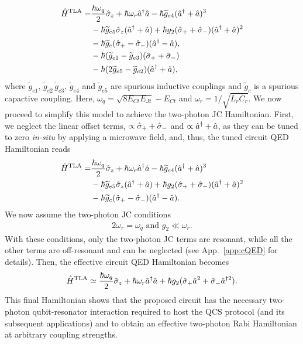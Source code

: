 \begin{align*}
    \hat{H}^{\text{TLA}}=&\frac{\hbar \omega_{q}}{2}\hat{\sigma}_z + \hbar \omega_r \hat{a}^\dagger \hat{a}  - \hbar \widetilde{g}_{e4}(\hat{a}^\dagger + \hat{a})^3 \nonumber\\&- \hbar \widetilde{g}_{e5}\hat{\sigma}_z(\hat{a}^\dagger + \hat{a})+ \hbar g_{2} (\hat{\sigma}_+ + \hat{\sigma}_-)(\hat{a}^\dagger+ \hat{a})^2 \nonumber\\ &- \hbar \widetilde{g}_c(\hat{\sigma}_+ -\hat{\sigma}_-)(\hat{a}^\dagger - \hat{a}),
    \nonumber\\ &- \hbar (\widetilde{g}_{e1}-\widetilde{g}_{e3})(\hat{\sigma}_+ + \hat{\sigma}_-) \nonumber\\ &- \hbar (2\widetilde{g}_{e5}-\widetilde{g}_{e2})(\hat{a}^\dagger +\hat{a}),
\end{align*}
where $\widetilde{g}_{e1},\,\widetilde{g}_{e2}\,\widetilde{g}_{e3},\,\widetilde{g}_{e4}$ and $\widetilde{g}_{e5}$ are spurious inductive couplings and $\widetilde{g}_{c}$ is a spurious capactive coupling. Here, $\omega_q=\sqrt{8E_{Ct} E_{Jt}}-E_{Ct}$ and $\omega_r=1/\sqrt{L_r\overline{C}_r}$. We now proceed to simplify this model to achieve the two-photon JC Hamiltonian. First, we neglect the linear offset terms, $\propto \hat{\sigma}_+ +\hat{\sigma}_-$ and $\propto \hat{a}^\dagger+\hat{a}$, as they can be tuned to zero \textit{in-situ} by applying a microwave field, and, thus, the tuned circuit QED Hamiltonian reads
\begin{align}\label{eq:TLAHamMain}
    \hat{H}^{\text{TLA}}=&\frac{\hbar \omega_{q}}{2}\hat{\sigma}_z + \hbar \omega_r \hat{a}^\dagger \hat{a}  - \hbar \widetilde{g}_{e4}(\hat{a}^\dagger + \hat{a})^3 \nonumber\\&- \hbar \widetilde{g}_{e5}\hat{\sigma}_z(\hat{a}^\dagger + \hat{a})+ \hbar g_{2} (\hat{\sigma}_+ + \hat{\sigma}_-)(\hat{a}^\dagger+ \hat{a})^2 \nonumber\\ &- \hbar \widetilde{g}_c(\hat{\sigma}_+ -\hat{\sigma}_-)(\hat{a}^\dagger - \hat{a}).
\end{align}
We now assume the two-photon JC conditions
\begin{align}
    2\omega_r=\omega_q \text{ and } g_2 \ll \omega_r.
\end{align}
With these conditions, only the two-photon JC terms are resonant, while all the other terms are off-resonant and can be neglected (see App.~\ref{app:cQED} for details). Then, the effective circuit QED Hamiltonian becomes
\begin{align}\label{eq:TwoPhJCMain}
    \hat{H}^{\text{TLA}}\simeq \frac{\hbar \omega_q}{2}\hat{\sigma}_z +\hbar\omega_r\hat{a}^\dagger \hat{a} + \hbar g_{2}( \hat{\sigma}_+ \hat{a}^2 + \hat{\sigma}_- \hat{a}^{\dagger 2}).
\end{align}
This final Hamiltonian shows that the proposed circuit has the necessary two-photon qubit-resonator interaction required to host the QCS protocol (and its subsequent applications) and to obtain an effective two-photon Rabi Hamiltonian at arbitrary coupling strengths.

